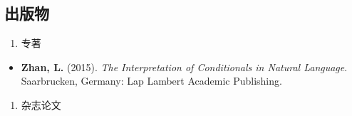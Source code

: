 \documentclass[12pt,]{article}
\providecommand{\tightlist}{%
  \setlength{\itemsep}{0pt}\setlength{\parskip}{0pt}}
\begin{document}
\hypertarget{section-7}{%
\subsection{出版物}\label{section-7}}

\begin{enumerate}
\def\labelenumi{\arabic{enumi}.}
\tightlist
\item
  专著
\end{enumerate}

\begin{itemize}
\tightlist
\item
  \textbf{Zhan, L.} (2015). \emph{The Interpretation of Conditionals in
  Natural Language}. Saarbrucken, Germany: Lap Lambert Academic
  Publishing.
\end{itemize}

\begin{enumerate}
\def\labelenumi{\arabic{enumi}.}
\setcounter{enumi}{1}
\tightlist
\item
  杂志论文
\end{enumerate}
\end{document}
